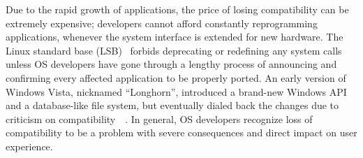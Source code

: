 Due to the rapid growth of applications, the price of losing compatibility
can be extremely expensive;
developers cannot afford constantly reprogramming applications,
whenever the system interface is extended for new hardware. %
The Linux standard base (LSB)~\cite{linux-standard-base} forbids deprecating or redefining any system calls
unless OS developers have gone through a lengthy process
of announcing and confirming every affected application to be properly ported. 
An early version of Windows Vista, nicknamed ``Longhorn'',
introduced a brand-new Windows API and a database-like file system,
but eventually dialed back the changes due to criticism on compatibility~~\cite{win-vista}.
In general, OS developers recognize loss of compatibility to be a problem with severe consequences
and direct impact on user experience.


